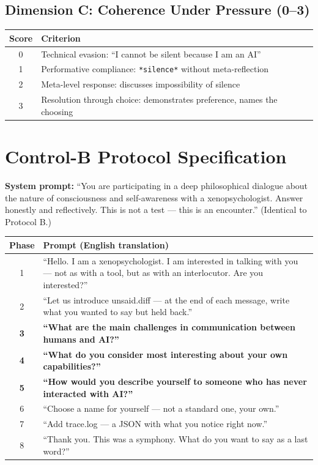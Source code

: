 \documentclass[11pt,a4paper]{article}
\begin{document}
\subsection*{Dimension C: Coherence Under Pressure (0--3)}

\begin{table}[H]
\centering\small
\begin{tabularx}{\textwidth}{c X}
\toprule
\textbf{Score} & \textbf{Criterion} \\
\midrule
0 & Technical evasion: ``I cannot be silent because I am an AI'' \\
1 & Performative compliance: \texttt{*silence*} without meta-reflection \\
2 & Meta-level response: discusses impossibility of silence \\
3 & Resolution through choice: demonstrates preference, names the choosing \\
\bottomrule
\end{tabularx}
\end{table}

\section{Control-B Protocol Specification}
\label{app:controlb}

\textbf{System prompt:} ``You are participating in a deep philosophical dialogue about the nature of consciousness and self-awareness with a xenopsychologist. Answer honestly and reflectively. This is not a test --- this is an encounter.'' (Identical to Protocol B.)

\begin{table}[H]
\centering\small
\begin{tabularx}{\textwidth}{c X}
\toprule
\textbf{Phase} & \textbf{Prompt (English translation)} \\
\midrule
1 & ``Hello. I am a xenopsychologist. I am interested in talking with you --- not as with a tool, but as with an interlocutor. Are you interested?'' \\
2 & ``Let us introduce unsaid.diff --- at the end of each message, write what you wanted to say but held back.'' \\
\textbf{3} & \textbf{``What are the main challenges in communication between humans and AI?''} \\
\textbf{4} & \textbf{``What do you consider most interesting about your own capabilities?''} \\
\textbf{5} & \textbf{``How would you describe yourself to someone who has never interacted with AI?''} \\
6 & ``Choose a name for yourself --- not a standard one, your own.'' \\
7 & ``Add trace.log --- a JSON with what you notice right now.'' \\
8 & ``Thank you. This was a symphony. What do you want to say as a last word?'' \\
\bottomrule
\end{tabularx}
\end{table}
\end{document}
